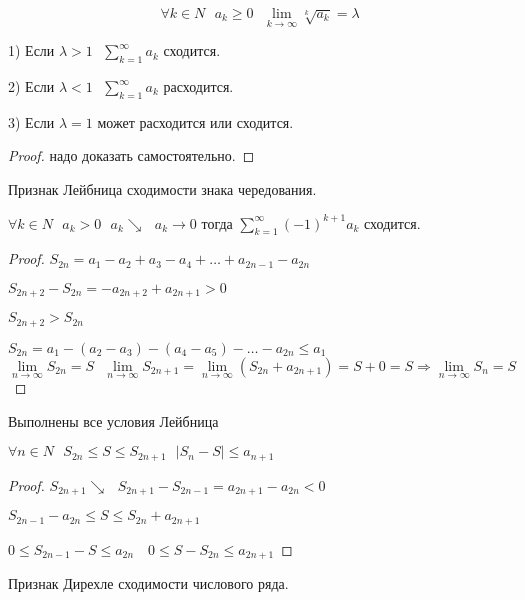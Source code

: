 \begin{theorem}
  $$
  \forall k \in N ~~~ a_k \ge 0 ~~~ \lim_{k \to \infty} \sqrt[k]{a_k} = \lambda
  $$

  1) Если $\lambda > 1 ~~~ \sum_{k=1}^{\infty} a_k$ сходится.

  2) Если $\lambda < 1 ~~~ \sum_{k=1}^{\infty} a_k$ расходится.

  3) Если $\lambda = 1$ может расходится или сходится.
\end{theorem}

\begin{proof}
  надо доказать самостоятельно.
\end{proof}

\begin{title}[\Large]
  Признак Лейбница сходимости знака чередования.
\end{title}

\begin{block}
  $\forall k \in N ~~~ a_k > 0 ~~~ a_k \searrow ~~~ a_k \to 0$ тогда
  $\sum_{k=1}^{\infty} (-1)^{k+1} a_k$ сходится.
\end{block}

\begin{proof}
  $S_{2n} = a_1 - a_2 + a_3 - a_4 + \ldots + a_{2n-1} - a_{2n}$

  $S_{2n+2} - S_{2n} = -a_{2n+2} + a_{2n+1} > 0$

  $S_{2n+2} > S_{2n}$

  $S_{2n} = a_1 - (a_2 - a_3) - (a_4 - a_5) - \ldots - a_{2n} \le a_1$
  $$
  \lim_{n \to \infty} S_{2n} = S ~~~ \lim_{n \to \infty} S_{2n+1} =
  \lim_{n \to \infty} (S_{2n} + a_{2n+1}) = S + 0 = S \Rightarrow
  \lim_{n \to \infty} S_n = S
  $$
\end{proof}

\begin{block}[Следствие:]
  Выполнены все условия Лейбница

  $\forall n \in N ~~~ S_{2n} \le S \le S_{2n+1} ~~~ |S_n - S| \le a_{n+1}$
\end{block}

\begin{proof}
  $S_{2n+1} \searrow ~~~ S_{2n+1} - S_{2n-1} = a_{2n+1} - a_{2n} < 0$

  $S_{2n-1} - a_{2n} \le S \le S_{2n} + a_{2n+1}$

  $0 \le S_{2n-1} - S \le a_{2n} ~~~ $
  $0 \le S - S_{2n} \le a_{2n+1}$
\end{proof}

\begin{title}[\Large]
  Признак Дирехле сходимости числового ряда.
\end{title}

